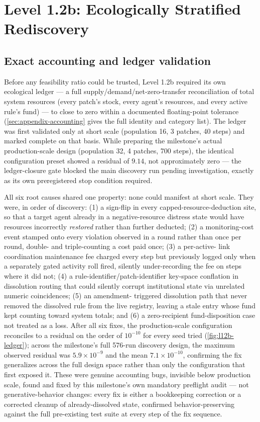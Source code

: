 \section{Level 1.2b: Ecologically Stratified Rediscovery}
\label{sec:level12b}

\subsection{Exact accounting and ledger validation}
\label{sec:level12b-ledger}

Before any feasibility ratio could be trusted, Level 1.2b required its own
ecological ledger --- a full supply/demand/net-zero-transfer
reconciliation of total system resources (every patch's stock, every
agent's resources, and every active rule's fund) --- to close to zero
within a documented floating-point tolerance
(\cref{sec:appendix-accounting} gives the full identity and category
list). The ledger was first validated only at short scale (population 16,
3 patches, 40 steps) and marked complete on that basis. While preparing
the milestone's actual production-scale design (population 32, 4 patches,
700 steps), the identical configuration preset showed a residual of
$9.14$, not approximately zero --- the ledger-closure gate blocked the
main discovery run pending investigation, exactly as its own preregistered
stop condition required.

All six root causes shared one property: none could manifest at short
scale. They were, in order of discovery: (1) a sign-flip in every
capped-resource-deduction site, so that a target agent already in a
negative-resource distress state would have resources incorrectly
\textit{restored} rather than further deducted; (2) a monitoring-cost
event stamped onto every violation observed in a round rather than once
per round, double- and triple-counting a cost paid once; (3) a per-active-
link coordination maintenance fee charged every step but previously logged
only when a separately gated activity roll fired, silently under-recording
the fee on steps where it did not; (4) a rule-identifier/patch-identifier
key-space conflation in dissolution routing that could silently corrupt
institutional state via unrelated numeric coincidences; (5) an amendment-
triggered dissolution path that never removed the dissolved rule from the
live registry, leaving a stale entry whose fund kept counting toward
system totals; and (6) a zero-recipient fund-disposition case not treated
as a loss. After all six fixes, the production-scale configuration
reconciles to a residual on the order of $10^{-10}$ for every seed tried
(\cref{fig:l12b-ledger}); across the milestone's full 576-run discovery
design, the maximum observed residual was $5.9\times10^{-9}$ and the mean
$7.1\times10^{-10}$, confirming the fix generalizes across the full design
space rather than only the configuration that first exposed it. These were
genuine accounting bugs, invisible below production scale, found and
fixed by this milestone's own mandatory preflight audit --- not
generative-behavior changes: every fix is either a bookkeeping correction
or a corrected cleanup of already-dissolved state, confirmed
behavior-preserving against the full pre-existing test suite at every step
of the fix sequence.

